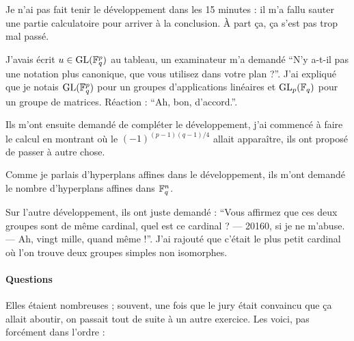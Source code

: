 \documentclass[a4paper, 11pt]{article}
\begin{document}
Je n'ai pas fait tenir le développement dans les 15 minutes : il m'a fallu
sauter une partie calculatoire pour arriver à la conclusion. À part ça, ça s'est
pas trop mal passé.

J'avais écrit $u \in \mathrm{GL}(\mathbb{F}_q^p)$ au tableau, un examinateur m'a demandé
\enquote{N'y a-t-il pas une notation plus canonique, que vous utilisez dans
  votre plan ?}. J'ai expliqué que je notais $\mathrm{GL}(\mathbb{F}_q^p)$ pour un groupes
d'applications linéaires et $\mathrm{GL}_p(\mathbb{F}_q)$ pour un groupe de matrices. Réaction :
\enquote{Ah, bon, d'accord.}.

Ils m'ont ensuite demandé de compléter le développement, j'ai commencé à
faire le calcul en montrant où le $(-1)^{(p-1)(q-1)/4}$ allait apparaître, ils
ont proposé de passer à autre chose.

Comme je parlais d'hyperplans affines dans le développement, ils m'ont demandé
le nombre d'hyperplans affines dans $\mathbb{F}_q^n$.

Sur l'autre développement, ils ont juste demandé : \enquote{Vous affirmez que
  ces deux groupes sont de même cardinal, quel est ce cardinal ? --- 20160, si
  je ne m'abuse. --- Ah, vingt mille, quand même !}. J'ai rajouté que c'était le
plus petit cardinal où l'on trouve deux groupes simples non isomorphes.

\paragraph{Questions}

Elles étaient nombreuses ; souvent, une fois que le jury était convaincu que ça
allait aboutir, on passait tout de suite à un autre exercice. Les voici, pas
forcément dans l'ordre :
\end{document}
